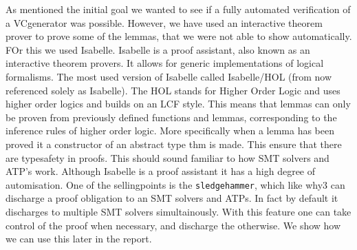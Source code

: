 As mentioned the initial goal we wanted to see if a fully automated verification of a VCgenerator was possible.
However, we have used an interactive theorem prover to prove some of the lemmas, that we were not able to show automatically.
FOr this we used Isabelle.
Isabelle is a proof assistant, also known as an interactive theorem provers.
It allows for generic implementations of logical formalisms.
The most used version of Isabelle called Isabelle/HOL (from now referenced solely as Isabelle).
The HOL stands for Higher Order Logic and uses higher order logics and builds on an LCF style.
This means that lemmas can only be proven from previously defined functions and lemmas, corresponding to the inference rules of higher order logic. More specifically when a lemma has been proved it a constructor of an abstract type thm is made. This ensure that there are typesafety in proofs.
This should sound familiar to how SMT solvers and ATP's work.
Although Isabelle is a proof assistant it has a high degree of automisation.
One of the sellingpoints is the \texttt{sledgehammer},
which like why3 can discharge a proof obligation to an SMT solvers and ATPs.
In fact by default it discharges to multiple SMT solvers simultainously.
With this feature one can take control of the proof when necessary, and discharge
the otherwise.
We show how we can use this later in the report.
